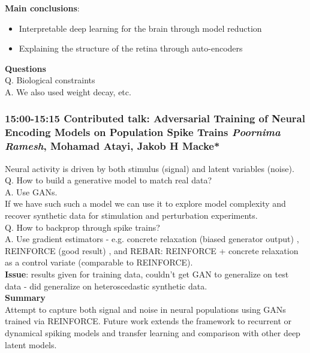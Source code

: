 \documentclass[12pt]{article}
\begin{document}
\textbf{Main conclusions}: \\
\begin{itemize}
\item Interpretable deep learning for the brain through model reduction
\item Explaining the structure of the retina through auto-encoders
\end{itemize}

\textbf{Questions} \\

Q. Biological constraints \\

A. We also used weight decay, etc.


\subsubsection{15:00-15:15 Contributed talk: Adversarial Training of Neural Encoding Models on Population Spike Trains \textit{Poornima Ramesh}, Mohamad Atayi, Jakob H Macke*}

Neural activity is driven by both stimulus (signal) and latent variables (noise). \\

Q. How to build a generative model to match real data? \\

A. Use GANs. \\

If we have such such a model we can use it to explore model complexity and recover synthetic data for stimulation and perturbation experiments. \\

Q. How to backprop through spike trains? \\

A. Use gradient estimators - e.g. concrete relaxation (biased generator output) \cite{Maddison16}, REINFORCE (good result) \cite{Williams1992}, and REBAR: REINFORCE + concrete relaxation as a control variate (comparable to REINFORCE). \\

\textbf{Issue}: results given for training data, couldn't get GAN to generalize on test data - did generalize on heteroscedastic synthetic data. \\

\textbf{Summary} \\
Attempt to capture both signal and noise in neural populations using GANs trained via REINFORCE. Future work extends the framework to recurrent or dynamical spiking models and transfer learning and comparison with other deep latent models.
\end{document}
